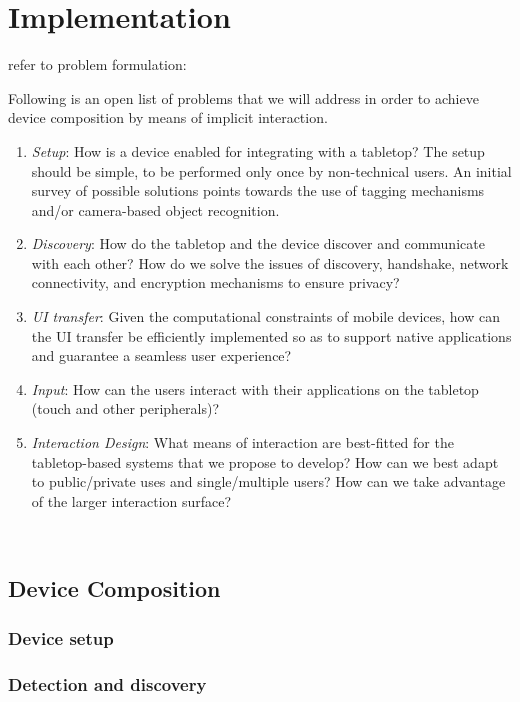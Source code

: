 

\chapter{Implementation}

refer to problem formulation:

Following is an open list of problems that we will address in order to achieve device composition by means of implicit interaction.
\begin{enumerate}
\item{\emph{Setup}: How is a device enabled for integrating with a tabletop?
The setup should be simple, to be performed only once by non-technical users.
An initial survey of possible solutions points towards the use of tagging mechanisms and/or camera-based object recognition.}
\item{\emph{Discovery}: How do the tabletop and the device discover and communicate with each other?
How do we solve the issues of discovery, handshake, network connectivity, and encryption mechanisms to ensure privacy?}
\item{\emph{UI transfer}: Given the computational constraints of mobile devices, how can the UI transfer be efficiently implemented so as to support native applications and guarantee a seamless user experience?}
\item{\emph{Input}: How can the users interact with their applications on the tabletop (touch and other peripherals)?}
\item{\emph{Interaction Design}: What means of interaction are best-fitted for the tabletop-based systems that we propose to develop?
How can we best adapt to public/private uses and single/multiple users?
How can we take advantage of the larger interaction surface?}
\end{enumerate}

\hfill\\

\section{Device Composition}

\subsection{Device setup}

\subsection{Detection and discovery}


